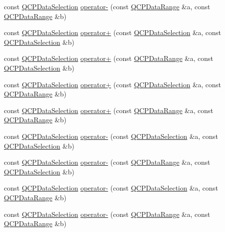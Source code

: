 \begin{DoxyCompactItemize}
\item 
const \hyperlink{class_q_c_p_data_selection}{Q\+C\+P\+Data\+Selection} \hyperlink{class_q_c_p_data_selection_ad62dd67b505c1fa9c02d1aafabcb9acf}{operator-\/} (const \hyperlink{class_q_c_p_data_range}{Q\+C\+P\+Data\+Range} \&a, const \hyperlink{class_q_c_p_data_range}{Q\+C\+P\+Data\+Range} \&b)
\item 
const \hyperlink{class_q_c_p_data_selection}{Q\+C\+P\+Data\+Selection} \hyperlink{class_q_c_p_data_selection_a49c0217af248959d59abfdd29401b678}{operator+} (const \hyperlink{class_q_c_p_data_selection}{Q\+C\+P\+Data\+Selection} \&a, const \hyperlink{class_q_c_p_data_selection}{Q\+C\+P\+Data\+Selection} \&b)
\item 
const \hyperlink{class_q_c_p_data_selection}{Q\+C\+P\+Data\+Selection} \hyperlink{class_q_c_p_data_selection_a5feed9419bd3df5cb4d4a761580545cc}{operator+} (const \hyperlink{class_q_c_p_data_range}{Q\+C\+P\+Data\+Range} \&a, const \hyperlink{class_q_c_p_data_selection}{Q\+C\+P\+Data\+Selection} \&b)
\item 
const \hyperlink{class_q_c_p_data_selection}{Q\+C\+P\+Data\+Selection} \hyperlink{class_q_c_p_data_selection_aa574f51a74d6998e9be95e252e6be287}{operator+} (const \hyperlink{class_q_c_p_data_selection}{Q\+C\+P\+Data\+Selection} \&a, const \hyperlink{class_q_c_p_data_range}{Q\+C\+P\+Data\+Range} \&b)
\item 
const \hyperlink{class_q_c_p_data_selection}{Q\+C\+P\+Data\+Selection} \hyperlink{class_q_c_p_data_selection_a0822e3133b80b5dedfc8050a19c1e0c5}{operator+} (const \hyperlink{class_q_c_p_data_range}{Q\+C\+P\+Data\+Range} \&a, const \hyperlink{class_q_c_p_data_range}{Q\+C\+P\+Data\+Range} \&b)
\item 
const \hyperlink{class_q_c_p_data_selection}{Q\+C\+P\+Data\+Selection} \hyperlink{class_q_c_p_data_selection_a41147ef7d6303c746e398278b7b624d1}{operator-\/} (const \hyperlink{class_q_c_p_data_selection}{Q\+C\+P\+Data\+Selection} \&a, const \hyperlink{class_q_c_p_data_selection}{Q\+C\+P\+Data\+Selection} \&b)
\item 
const \hyperlink{class_q_c_p_data_selection}{Q\+C\+P\+Data\+Selection} \hyperlink{class_q_c_p_data_selection_a726652cb9ed840e3025435cc2c266468}{operator-\/} (const \hyperlink{class_q_c_p_data_range}{Q\+C\+P\+Data\+Range} \&a, const \hyperlink{class_q_c_p_data_selection}{Q\+C\+P\+Data\+Selection} \&b)
\item 
const \hyperlink{class_q_c_p_data_selection}{Q\+C\+P\+Data\+Selection} \hyperlink{class_q_c_p_data_selection_a32c5784ac70946f09a09b2dd19816b78}{operator-\/} (const \hyperlink{class_q_c_p_data_selection}{Q\+C\+P\+Data\+Selection} \&a, const \hyperlink{class_q_c_p_data_range}{Q\+C\+P\+Data\+Range} \&b)
\item 
const \hyperlink{class_q_c_p_data_selection}{Q\+C\+P\+Data\+Selection} \hyperlink{class_q_c_p_data_selection_ad62dd67b505c1fa9c02d1aafabcb9acf}{operator-\/} (const \hyperlink{class_q_c_p_data_range}{Q\+C\+P\+Data\+Range} \&a, const \hyperlink{class_q_c_p_data_range}{Q\+C\+P\+Data\+Range} \&b)
\end{DoxyCompactItemize}
